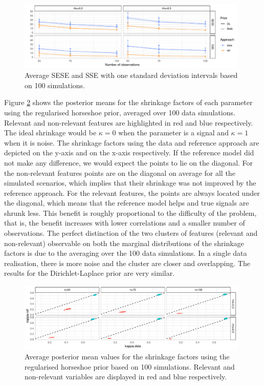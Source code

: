 \documentclass[american,]{article}
\theoremstyle{definition}
\begin{document}
\begin{figure}[tp]
  \centering
  \includegraphics[width=0.98\textwidth]{graphics/SESE_SSE.pdf}
  \caption{Average SESE and SSE with one standard deviation intervals based on 100 simulations.\\}
  \label{fig:SESE_SSE}
\end{figure}

Figure \ref{fig:k} shows the posterior means for the shrinkage factors
of each parameter using the regularised horseshoe prior, averaged over
100 data simulations. Relevant and non-relevant features are
highlighted in red and blue respectively. The ideal shrinkage would be
$\kappa=0$ when the parameter is a signal and $\kappa=1$ when it is
noise. The shrinkage factors using the data and reference approach are
depicted on the y-axis and on the x-axis respectively. If the
reference model did not make any difference, we would expect the
points to lie on the diagonal. For the non-relevant features points
are on the diagonal on average for all the simulated scenarios, which
implies that their shrinkage was not improved by the reference
approach. For the relevant features, the points are always located
under the diagonal, which means that the reference model helps and
true signals are shrunk less. This benefit is roughly proportional to
the difficulty of the problem, that is, the benefit increases with
lower correlations and a smaller number of observations. The perfect
distinction of the two clusters of features (relevant and
non-relevant) observable on both the marginal distributions of the
shrinkage factors is due to the averaging over the 100 data
simulations. In a single data realisation, there is more noise and the
cluster are closer and overlapping. The results for the
Dirichlet-Laplace prior are very similar.

\begin{figure}[tp]
  \centering
  \includegraphics[width=0.98\textwidth]{graphics/k_RHS.pdf}
  \caption{Average posterior mean values for the shrinkage factors
    using the regularised horseshoe prior based on 100
    simulations. Relevant and non-relevant variables are displayed in
    red and blue respectively.\\}
  \label{fig:k}
\end{figure}
\end{document}
